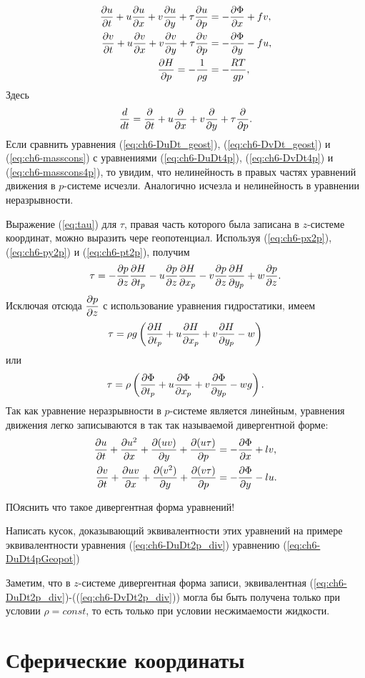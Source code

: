    \begin{align}
        \pd{u}{t}+u\pd{u}{x}+v\pd{u}{y}+\tau\pd{u}{p} &= - \pd{\Phi}{x}+fv, \label{eq:ch6-DuDt4pGeopot} \\
        \pd{v}{t}+u\pd{v}{x}+v\pd{v}{y}+\tau\pd{v}{p} &= -\pd{\Phi}{y}-fu, \label{eq:ch6-DvDt4pGeopot}\\
        \pd{H}{p}=-\frac{1}{\rho g}&=-\frac{RT}{gp}, \label{eq:ch6-DhDp4pGeopot}\\
   \end{align}
   Здесь 
   \begin{equation*}
       \td{}{t}=\pd{}{t}+u\pd{}{x}+v\pd{}{y}+\tau\pd{}{p}.
   \end{equation*}
   Если сравнить уравнения (\ref{eq:ch6-DuDt_geost}), (\ref{eq:ch6-DvDt_geost}) и (\ref{eq:ch6-masscons}) с уравнениями (\ref{eq:ch6-DuDt4p}), (\ref{eq:ch6-DvDt4p}) и (\ref{eq:ch6-masscons4p}), то увидим, что нелинейность в правых частях уравнений движения в $p$-системе исчезли. Аналогично исчезла и нелинейность в уравнении неразрывности.

   Выражение (\ref{eq:tau}) для $\tau$, правая часть которого была записана в $z$-системе координат, можно выразить чере геопотенциал. Используя (\ref{eq:ch6-px2p}), (\ref{eq:ch6-py2p}) и (\ref{eq:ch6-pt2p}), получим
   \[
    \tau=-\pd{p}{z}\pd{H}{t_p}-u\pd{p}{z}\pd{H}{x_p}-v\pd{p}{z}\pd{H}{y_p}+w\pd{p}{z}.
   \]
   Исключая отсюда $\pd{p}{z}$ с использование уравнения гидростатики, имеем
   \begin{equation}
       \tau=\rho g \left( \pd{H}{t_p} + u\pd{H}{x_p} + v\pd{H}{y_p} - w \right)
   \end{equation}
   или
   \begin{equation}
       \tau=\rho \left( \pd{\Phi}{t_p} + u\pd{\Phi}{x_p} + v\pd{\Phi}{y_p} - wg \right).
   \end{equation}
   Так как уравнение неразрывности в $p$-системе является линейным, уравнения движения легко записываются в так так называемой дивергентной форме:
   \begin{align}
       \pd{u}{t} + \pd{u^2}{x} + \pd{(uv)}{y}  + \pd{(u \tau)}{p} &= -\pd{\Phi}{x}+lv, \label{eq:ch6-DuDt2p_div} \\
       \pd{v}{t} + \pd{uv}{x}  + \pd{(v^2)}{y} + \pd{(v \tau)}{p} &= -\pd{\Phi}{y}-lu. \label{eq:ch6-DvDt2p_div}
   \end{align}
   \begin{warn}
        ПОяснить что такое дивергентная форма уравнений!
   \end{warn}
   \begin{warn}
        Написать кусок, доказывающий эквивалентности этих уравнений на примере эквивалентности уравнения (\ref{eq:ch6-DuDt2p_div}) уравнению (\ref{eq:ch6-DuDt4pGeopot})
   \end{warn}
   Заметим, что в $z$-системе дивергентная форма записи, эквивалентная (\ref{eq:ch6-DuDt2p_div})-((\ref{eq:ch6-DvDt2p_div})) могла бы быть получена только при условии $\rho=const$, то есть только при условии несжимаемости жидкости.
   
   

    
    

\section{Сферические координаты}





